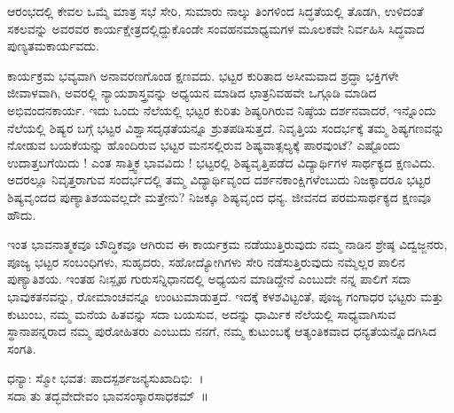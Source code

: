 {ಆರಂಭದಲ್ಲಿ ಕೇವಲ ಒಮ್ಮೆ ಮಾತ್ರ ಸಭೆ ಸೇರಿ, ಸುಮಾರು ನಾಲ್ಕು ತಿಂಗಳಿಂದ ಸಿದ್ಧತೆಯಲ್ಲಿ ತೊಡಗಿ, ಉಳಿದಂತೆ ಸಕಲವನ್ನು ಅವರವರ ಕಾರ್ಯಕ್ಷೇತ್ರದಲ್ಲಿದ್ದುಕೊಂಡೇ ಸಂವಹನಮಾಧ್ಯಮಗಳ ಮೂಲಕವೇ ನಿರ್ವಹಿಸಿ ಸಿದ್ಧವಾದ ಪುಣ್ಯತಮಕಾರ್ಯವದು. 

ಕಾರ್ಯಕ್ರಮ ಭವ್ಯವಾಗಿ ಅನಾವರಣಗೊಂಡ ಕ್ಷಣವದು. ಭಟ್ಟರ ಕುರಿತಾದ ಅಸೀಮವಾದ ಶ್ರದ್ಧಾ  \enginline{-}  ಭಕ್ತಿಗಳೇ ಜೀವಾಳವಾಗಿ, ಅವರಲ್ಲಿ ನ್ಯಾಯಶಾಸ್ತ್ರವನ್ನು ಅಧ್ಯಯನ ಮಾಡಿದ ಛಾತ್ರನಿವಹವೇ ಒಗ್ಗೂಡಿ ಮಾಡಿದ ಅಭಿವಂದನಕಾರ್ಯ.    ಇದು ಒಂದು ನೆಲೆಯಲ್ಲಿ ಭಟ್ಟರ ಕುರಿತು ಶಿಷ್ಯರಿಗಿರುವ ನಿಷ್ಠೆಯ ದರ್ಶನವಾದರೆ, ಇನ್ನೊಂದು ನೆಲೆಯಲ್ಲಿ  ಶಿಷ್ಯರ ಬಗ್ಗೆ ಭಟ್ಟರ ವಿಶ್ವಾಸದೃಢತೆಯನ್ನೂ ಶ್ರುತಪಡಿಸುತ್ತದೆ. ನಿವೃತ್ತಿಯ ಸಂದರ್ಭಕ್ಕೆ  ತಮ್ಮ ಶಿಷ್ಯಗಣವನ್ನು ನೋಡುವ ಬಯಕೆಯನ್ನು ಹೊಂದಿರುವ ಭಟ್ಟರ ಮನಸಲ್ಲಿರುವ ಶಿಷ್ಯವಾತ್ಸಲ್ಯಕ್ಕೆ ಪಾರವುಂಟೆ? ಎಷ್ಟೊಂದು ಉದಾತ್ತಬಗೆಯಿದು ! ಎಂತ ಸಾತ್ತ್ವಿಕ ಭಾವವಿದು ! ಭಟ್ಟರಲ್ಲಿ ಶಿಷ್ಯವೃತ್ತಿಪಡೆದ ವಿದ್ಯಾರ್ಥಿಗಳ ಸಾರ್ಥಕ್ಯದ ಕ್ಷಣವಿದು. ಅದರಲ್ಲೂ ನಿವೃತ್ತರಾಗುವ ಸಂದರ್ಭದಲ್ಲಿ ತಮ್ಮ ವಿದ್ಯಾರ್ಥಿವೃಂದ  \enginline{-}  ದರ್ಶನಕಾಂಕ್ಷಿಗಳೆಂಬುದು ನಿಜಕ್ಕಾದರೂ ಭಟ್ಟರ ಶಿಷ್ಯವೃಂದದ ಪುಣ್ಯಾತಿಶಯವಲ್ಲದೇ ಮತ್ತೇನು? ನಿಜಕ್ಕೂ ಶಿಷ್ಯವೃಂದ ಧನ್ಯ. ಜೀವನದ ಪರಮಸಾರ್ಥಕ್ಯದ ಕ್ಷಣವೂ ಹೌದು. 

ಇಂತ ಭಾವನಾತ್ಮಕವೂ  \enginline{-}  ಬೌದ್ಧಿಕವೂ ಆಗಿರುವ ಈ ಕಾರ್ಯಕ್ರಮ ನಡೆಯುತ್ತಿರುವುದು ನಮ್ಮ ನಾಡಿನ ಶ್ರೇಷ್ಠ ವಿದ್ವಜ್ಜನರು, ಪೂಜ್ಯ ಭಟ್ಟರ ಸಂಬಂಧಿಗಳು, ಸುಹೃದರು, ಸಹೋದ್ಯೋಗಿಗಳು ಸೇರಿ ನಡೆಸುತ್ತಿರುವುದು ನಮ್ಮೆಲ್ಲರ ಪಾಲಿನ ಪುಣ್ಯಾತಿಶಯ. ಇಂತಹ ನಿಃಸ್ಪೃಹ ಗುರುಸನ್ನಿಧಾನದಲ್ಲಿ ಅಧ್ಯಯನ ಮಾಡಿದ್ದೇನೆ ಎಂಬುದೇ ನನ್ನ ಪಾಲಿಗೆ ಸದಾ ಭಾವುಕತನವನ್ನು, ರೋಮಾಂಚವನ್ನೂ ಉಂಟುಮಾಡುತ್ತದೆ. ಇದಕ್ಕೆ ಕಳಶವಿಟ್ಟಂತೆ, ಪೂಜ್ಯ ಗಂಗಾಧರ ಭಟ್ಟರು ಮತ್ತು ಕುಟುಂಬ, ನಮ್ಮ ಮನೆಯ ಹಿತವನ್ನು ಸದಾ ಬಯಸುವ, ಅದನ್ನು ಧಾರ್ಮಿಕ ನೆಲೆಯಲ್ಲಿ ಸಾಧ್ಯವಾಗಿಸುವ ಸ್ಥಾನಾಪನ್ನರಾದ ನಮ್ಮ ಪುರೋಹಿತರು ಎಂಬುದು ನನಗೆ, ನಮ್ಮ ಕುಟುಂಬಕ್ಕೆ ಆತ್ಯಂತಿಕವಾದ ಧನ್ಯತೆಯನ್ನೊದಗಿಸಿದ ಸಂಗತಿ. 
\begin{center}
ಧನ್ಯಾ: ಸ್ಮೋ ಭವತ: ಪಾದಸ್ಪರ್ಶಜನ್ಯಸುಖಾದಿಭಿ:~।\\
ಸದಾ ತು ತದ್ಭವೇದೇವಂ ಭಾವಸಂಸ್ಕಾರಸಾಧಕಮ್~॥
\end{center}

\articleend	
}
